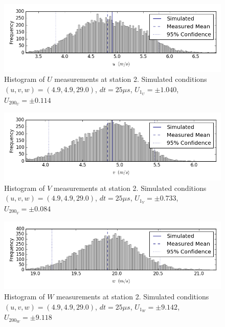 \begin{figure}[H]
\centering
\includegraphics[width=6in]{figs/Ely_May28th02001/uncertainty_Ely_May28th02001_U}
\caption{Histogram of $U$ measurements at station 2. Simulated conditions $(u,v,w)=(4.9, 4.9, 29.0)$, $dt=25 \mu s$, $U_1_U=\pm 1.040$, $U_200_U=\pm 0.114$}
\label{fig:uncertainty_Ely_May28th02001_U}
\end{figure}


\begin{figure}[H]
\centering
\includegraphics[width=6in]{figs/Ely_May28th02001/uncertainty_Ely_May28th02001_V}
\caption{Histogram of $V$ measurements at station 2. Simulated conditions $(u,v,w)=(4.9, 4.9, 29.0)$, $dt=25 \mu s$, $U_1_V=\pm 0.733$, $U_200_V=\pm 0.084$}
\label{fig:uncertainty_Ely_May28th02001_V}
\end{figure}


\begin{figure}[H]
\centering
\includegraphics[width=6in]{figs/Ely_May28th02001/uncertainty_Ely_May28th02001_W}
\caption{Histogram of $W$ measurements at station 2. Simulated conditions $(u,v,w)=(4.9, 4.9, 29.0)$, $dt=25 \mu s$, $U_1_W=\pm 9.142$, $U_200_W=\pm 9.118$}
\label{fig:uncertainty_Ely_May28th02001_W}
\end{figure}



